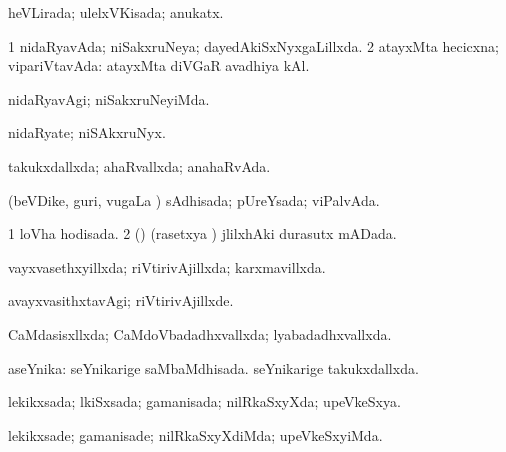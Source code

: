 {{\bentry
{} 
\gl{\gu}
\expl{}
\bmng
heVLirada; ulelxVKisada; anukatx. 
\emng
\eentry

\bentry
{} 
\gl{\gu}
\expl{}
\bmng
{} 
\emng
\eentry

\bentry
{} 
\gl{\gu}
\expl{}
\bmng
\bnum
\num{1} nidaRyavAda; niSakxruNeya; dayedAkiSxNyxgaLillxda. 
\num{2} atayxMta hecicxna; vipariVtavAda:  atayxMta diVGaR avadhiya kAl. 
\enum
\emng
\eentry

\bentry
{} 
\gl{\kirxvi}
\expl{}
\bmng
nidaRyavAgi; niSakxruNeyiMda. 
\emng
\eentry

\bentry
{} 
\gl{\nA}
\expl{}
\bmng
nidaRyate; niSAkxruNyx. 
\emng
\eentry

\bentry
{} 
\gl{\gu}
\expl{}
\bmng
takukxdallxda; ahaRvallxda; anahaRvAda. 
\emng
\eentry

\bentry
{} 
\gl{\gu}
\bmng
(beVDike, guri, \mo vugaLa \vi) sAdhisada; pUreYsada; viPalvAda. 
\emng
\eentry

\bentry
{} 
\gl{\gu}
\expl{}
\bmng
\bnum
\num{1} loVha hodisada. 
\num{2} (\birx) (rasetxya \vi) jlilxhAki durasutx mADada. 
\enum
\emng
\eentry

\bentry
{} 
\gl{\gu}
\expl{}
\bmng
vayxvasethxyillxda; riVtirivAjillxda; karxmavillxda. 
\emng
\eentry

\bentry
{} 
\gl{\kirxvi}
\expl{}
\bmng
avayxvasithxtavAgi; riVtirivAjillxde. 
\emng
\eentry

\bentry
{} 
\gl{\gu}
\expl{}
\bmng
CaMdasisxllxda; CaMdoVbadadhxvallxda; lyabadadhxvallxda. 
\emng
\eentry

\bentry
{} 
\gl{\gu}
\expl{}
\bmng
aseYnika: 
\banum
{} seYnikarige saMbaMdhisada. 
 seYnikarige takukxdallxda. 
\eanum
\emng
\eentry

\bentry
{} 
\gl{\gu}
\expl{}
\bmng
lekikxsada; lkiSxsada; gamanisada; nilRkaSxyXda; upeVkeSxya. 
\emng
\eentry

\bentry
{} 
\gl{\kirxvi}
\expl{}
\bmng
lekikxsade; gamanisade; nilRkaSxyXdiMda; upeVkeSxyiMda. 
\emng
\eentry

}}
